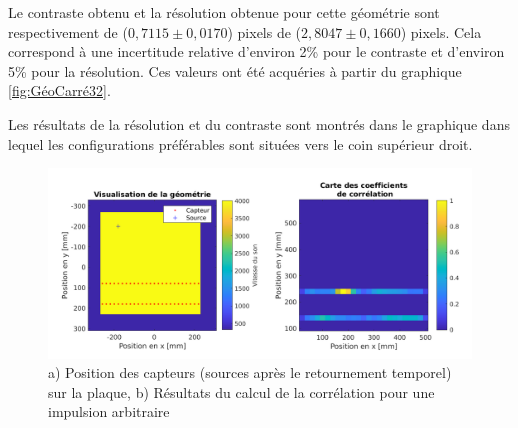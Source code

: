 \documentclass[conference]{IEEEtran}
\begin{document}

Le contraste obtenu et la résolution obtenue pour cette géométrie sont
respectivement de ($0,7115 \pm 0,0170$) pixels de ($2,8047 \pm 0,1660$) pixels. Cela correspond à une 
incertitude relative d'environ 2\% pour le contraste et d'environ 5\% pour la résolution. Ces valeurs ont 
été acquéries à partir du graphique \ref{fig:GéoCarré32}.



Les résultats de la résolution et du contraste sont montrés dans le graphique 
\cite{fig:rés-con} dans lequel les configurations préférables sont situées vers le 
coin supérieur droit. 

\begin{figure}[H]
  \centering
  \includegraphics[scale=0.25]{resultats1.png}
  \caption{a) Position des capteurs (sources après le retournement temporel)
  sur la plaque,  b) Résultats du calcul de la corrélation pour une impulsion arbitraire}
  \label{fig:graph1}
\end{figure}
\end{document}
